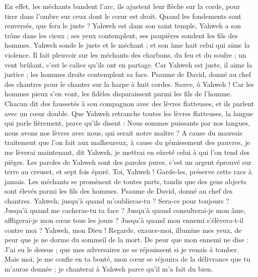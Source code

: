 \begin{multicols}{2}
En effet, les méchants bandent l'arc, ils ajustent leur flèche sur la corde, pour tirer dans l'ombre sur ceux dont le cœur est droit.
Quand les fondements sont renversés, que fera le juste ?
Yahweh est dans son saint temple, Yahweh a son trône dans les cieux ; ses yeux contemplent, ses paupières sondent les fils des hommes.
Yahweh sonde le juste et le méchant ; et son âme hait celui qui aime la violence.
Il fait pleuvoir sur les méchants des charbons, du feu et du soufre ; un vent brûlant, c'est le calice qu'ils ont en partage.
Car Yahweh est juste, il aime la justice ; les hommes droits contemplent sa face.
\VerseOne{}Psaume de David, donné au chef des chantres pour le chanter sur la harpe à huit cordes.
Sauve, ô Yahweh ! Car les hommes pieux s'en vont, les fidèles disparaissent parmi les fils de l'homme.
Chacun dit des faussetés à son compagnon avec des lèvres flatteuses, et ils parlent avec un cœur double.
Que Yahweh retranche toutes les lèvres flatteuses, la langue qui parle fièrement,
parce qu'ils disent : Nous sommes puissants par nos langues, nous avons nos lèvres avec nous, qui serait notre maître ?
A cause du mauvais traitement que l'on fait aux malheureux, à cause du gémissement des pauvres, je me lèverai maintenant, dit Yahweh, je mettrai en sûreté celui à qui l'on tend des pièges.
Les paroles de Yahweh sont des paroles pures, c'est un argent éprouvé sur terre au creuset, et sept fois épuré.
Toi, Yahweh ! Garde-les, préserve cette race à jamais.
Les méchants se promènent de toutes parts, tandis que des gens abjects sont élevés parmi les fils des hommes.
\VerseOne{}Psaume de David, donné au chef des chantres.
Yahweh, jusqu'à quand m'oublieras-tu ? Sera-ce pour toujours ? Jusqu'à quand me cacheras-tu ta face ?
Jusqu'à quand consulterai-je mon âme, affligerai-je mon cœur tous les jours ? Jusqu'à quand mon ennemi s'élèvera-t-il contre moi ?
Yahweh, mon Dieu ! Regarde, exauce-moi, illumine mes yeux, de peur que je ne dorme du sommeil de la mort.
De peur que mon ennemi ne dise : J'ai eu le dessus ; que mes adversaires ne se réjouissent si je venais à tomber.
Mais moi, je me confie en ta bonté, mon cœur se réjouira de la délivrance que tu m'auras donnée ; je chanterai à Yahweh parce qu'il m'a fait du bien.

\end{multicols}

